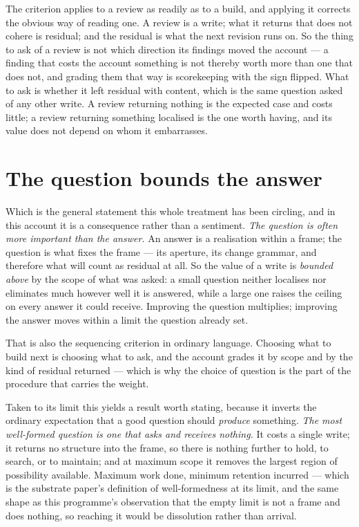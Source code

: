 \documentclass[11pt,a4paper]{article}
\theoremstyle{remark}\newtheorem{remark}[definition]{Remark}
\begin{document}
The criterion applies to a review as readily as to a build, and applying it corrects the obvious way of
reading one. A review is a write; what it returns that does not cohere is residual; and the residual is
what the next revision runs on. So the thing to ask of a review is not which direction its findings
moved the account --- a finding that costs the account something is not thereby worth more than one
that does not, and grading them that way is scorekeeping with the sign flipped. What to ask is whether
it left residual with content, which is the same question asked of any other write. A review returning
nothing is the expected case and costs little; a review returning something localised is the one worth
having, and its value does not depend on whom it embarrasses.

\section{The question bounds the answer}\label{sec:question}

Which is the general statement this whole treatment has been circling, and in this account it is a
consequence rather than a sentiment. \emph{The question is often more important than the answer.} An
answer is a realisation within a frame; the question is what fixes the frame --- its aperture, its
change grammar, and therefore what will count as residual at all. So the value of a write is
\emph{bounded above} by the scope of what was asked: a small question neither localises nor eliminates
much however well it is answered, while a large one raises the ceiling on every answer it could
receive. Improving the question multiplies; improving the answer moves within a limit the question
already set.

That is also the sequencing criterion in ordinary language. Choosing what to build next is choosing
what to ask, and the account grades it by scope and by the kind of residual returned --- which is why
the choice of question is the part of the procedure that carries the weight.

Taken to its limit this yields a result worth stating, because it inverts the ordinary expectation
that a good question should \emph{produce} something. \emph{The most well-formed question is one that
asks and receives nothing.} It costs a single write; it returns no structure into the frame, so there
is nothing further to hold, to search, or to maintain; and at maximum scope it removes the largest
region of possibility available. Maximum work done, minimum retention incurred --- which is
the substrate paper's definition of well-formedness at its limit, and the same shape as this programme's observation that
the empty limit is not a frame and does nothing, so reaching it would be dissolution rather than arrival.
\end{document}

